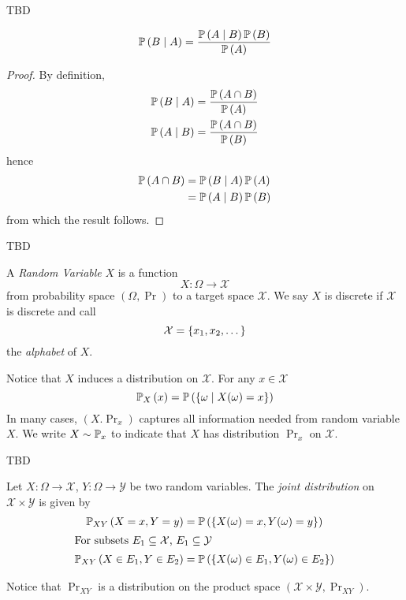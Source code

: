\begin{example}
    TBD
\end{example}

\begin{theorem}
    \[\prob{B \given A} = \frac{\prob{A \given B}\prob{B}}{\prob{A}}\]
\end{theorem}

\begin{proof}
    By definition,
    \begin{align*}
        \prob{B \given A} & = \frac{\prob{A \cap B}}{\prob{A}} \\
        \prob{A \given B} & = \frac{\prob{A \cap B}}{\prob{B}}
    \end{align*}
    hence
    \begin{align*}\prob{A \cap B}
         & = \prob{B \given A}\prob{A} \\
         & = \prob{A \given B}\prob{B}
    \end{align*}
    from which the result follows.
\end{proof}

\begin{example}
    TBD
\end{example}

\begin{definition}
    A \emph{Random Variable} $X$ is a function
    \[X: \Omega \to \mathcal{X}\]
    from probability space $(\Omega, \Pr)$ to a target space $\mathcal{X}$. We
    say $X$ is discrete if $\mathcal{X}$ is discrete and call
    \[\mathcal{X} = \left\lbrace x_1, x_2, \dots\right\rbrace\]
    the \emph{alphabet} of $X$.
\end{definition}

Notice that $X$ induces a distribution on $\mathcal{X}$. For any $x \in \mathcal{X}$
\[\prob[X]{x} = \prob{\set{\omega \suchthat X(\omega) = x}}\]
In many cases, $(X. \Pr_x)$ captures all information needed from random variable $X$.
We write $X \sim \mathbb{P}_x$ to indicate that $X$ has distribution $\Pr_x$ on $\mathcal{X}$.

\begin{example}
    TBD
\end{example}

\begin{definition}
    Let $X: \Omega \to \mathcal{X}$, $Y: \Omega \to \mathcal{Y}$ be two random variables.
    The \emph{joint distribution} on $\mathcal{X} \times \mathcal{Y}$ is given by
    \begin{align*}
        \prob[XY]{X = x, Y = y}         & = \prob{\set{X(\omega) = x, Y(\omega) = y}}         \\
        \shortintertext{For subsets $E_1\subseteq \mathcal{X}$, $E_1 \subseteq \mathcal{Y}$}
        \prob[XY]{X \in E_1, Y \in E_2} & = \prob{\set{X(\omega) \in E_1, Y(\omega) \in E_2}}
    \end{align*}
\end{definition}
Notice that $\Pr_{XY}$ is a distribution on the product space
$(\mathcal{X} \times \mathcal{Y}, \Pr_{XY})$.

